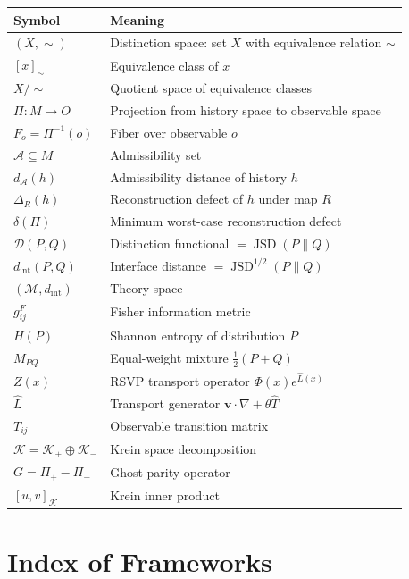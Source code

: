 \documentclass[12pt,a4paper]{book}
\theoremstyle{remark}
\theoremstyle{definition}
\begin{document}
\begin{tabular}{p{3.5cm}p{8cm}}
\toprule
Symbol & Meaning \\
\midrule
$(X, \sim)$ & Distinction space: set $X$ with equivalence relation $\sim$ \\
$[x]_\sim$ & Equivalence class of $x$ \\
$X/{\sim}$ & Quotient space of equivalence classes \\
$\Pi : M \to O$ & Projection from history space to observable space \\
$F_o = \Pi^{-1}(o)$ & Fiber over observable $o$ \\
$\mathcal{A} \subseteq M$ & Admissibility set \\
$d_\mathcal{A}(h)$ & Admissibility distance of history $h$ \\
$\Delta_R(h)$ & Reconstruction defect of $h$ under map $R$ \\
$\delta(\Pi)$ & Minimum worst-case reconstruction defect \\
$\mathcal{D}(P,Q)$ & Distinction functional $= \operatorname{JSD}(P\|Q)$ \\
$d_{\mathrm{int}}(P,Q)$ & Interface distance $= \operatorname{JSD}^{1/2}(P\|Q)$ \\
$(\mathcal{M}, d_{\mathrm{int}})$ & Theory space \\
$g^F_{ij}$ & Fisher information metric \\
$H(P)$ & Shannon entropy of distribution $P$ \\
$M_{PQ}$ & Equal-weight mixture $\tfrac{1}{2}(P+Q)$ \\
$Z(x)$ & RSVP transport operator $\Phi(x)e^{\widehat{L}(x)}$ \\
$\widehat{L}$ & Transport generator $\mathbf{v}\cdot\nabla + \theta\widehat{T}$ \\
$T_{ij}$ & Observable transition matrix \\
$\mathcal{K} = \mathcal{K}_+ \oplus \mathcal{K}_-$ & Krein space decomposition \\
$G = \Pi_+ - \Pi_-$ & Ghost parity operator \\
$[u,v]_\mathcal{K}$ & Krein inner product \\
\bottomrule
\end{tabular}

\chapter{Index of Frameworks}
\end{document}
